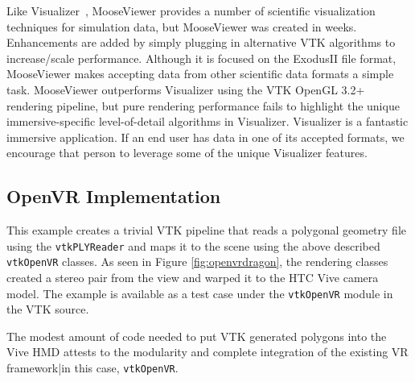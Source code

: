 Like Visualizer~\cite{Billen:2008}, MooseViewer provides a number of scientific visualization techniques for simulation data, but MooseViewer was created in weeks. Enhancements are added by simply plugging in alternative VTK algorithms to increase/scale performance.  Although it is focused on the ExodusII file format, MooseViewer makes accepting data from other scientific data formats a simple task. MooseViewer outperforms Visualizer using the VTK OpenGL 3.2+ rendering pipeline, but pure rendering performance fails to highlight the unique immersive-specific level-of-detail algorithms in Visualizer. Visualizer is a fantastic immersive application. If an end user has data in one of its accepted formats, we encourage that person to leverage some of the unique Visualizer features.


\subsection{OpenVR Implementation}

This example creates a trivial VTK pipeline that reads a polygonal geometry file
using the \texttt{vtkPLYReader} and maps it to the scene using the above described \texttt{vtkOpenVR}
classes. As seen in Figure \ref{fig:openvrdragon}, the rendering
classes created a stereo pair from the view and warped it to the HTC Vive camera model. 
The example is available as a test case under the
\texttt{vtkOpenVR} module in the VTK source.

The modest amount of code needed to put VTK generated polygons into the
Vive HMD attests to the modularity and complete integration of the
existing VR framework|in this case, \texttt{vtkOpenVR}.
